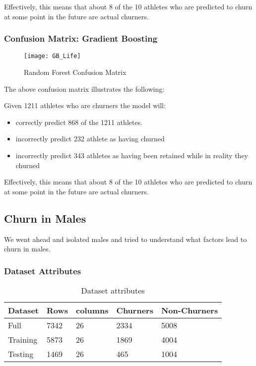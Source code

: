\documentclass[
10pt, %
a4paper, %
oneside, %
headinclude,footinclude, %
BCOR5mm, %
]{scrartcl}
\begin{document}
Effectively, this means that about 8 of the 10 athletes who are predicted to churn at some point in the future are actual churners.

\subsubsection{Confusion Matrix: Gradient Boosting}

\begin{figure}[H]
\centering 
\texttt{[image: GB\_Life]} 
\caption[Lostic Regression Confusion Matrix]{Random Forest Confusion Matrix} %
\label{fig:gallery} 
\end{figure}

The above confusion matrix illustrates the following: 

Given 1211 athletes who are churners the model will:

\begin{itemize}
\item correctly predict 868 of the 1211 athletes. 
\item incorrectly predict 232 athlete as having churned 
\item incorrectly predict 343 athletes as having been retained while in reality they churned
\end{itemize}

Effectively, this means that about 8 of the 10 athletes who are predicted to churn at some point in the future are actual churners.

\subsection{Churn in Males}

We went ahead and isolated males and tried to understand what factors lead to churn in males. 

\subsubsection{Dataset Attributes}

\begin{table}[H]
\centering
\caption{Dataset attributes}
\label{my-label}
\begin{tabular}{@{}lllll@{}}
\toprule
Dataset  & Rows  & columns & Churners & Non-Churners \\ \midrule
Full     & 7342 & 26      & 2334     & 5008        \\
Training & 5873 & 26      & 1869     & 4004         \\
Testing  & 1469  & 26      & 465     & 1004         \\ \bottomrule
\end{tabular}
\end{table}
\end{document}
